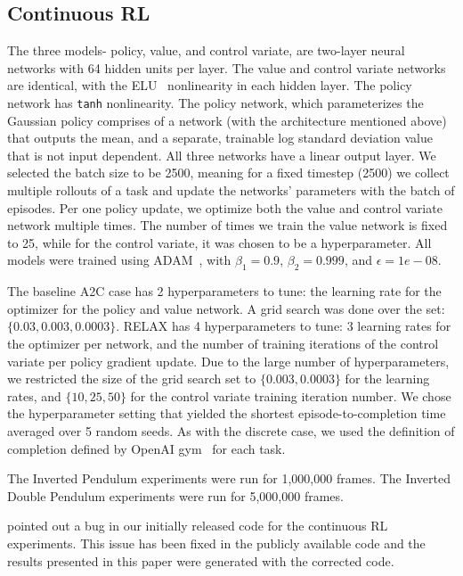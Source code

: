 \documentclass{article}
\newcommand{\RELAX}{{\textnormal{RELAX}}}
\begin{document}
\subsection{Continuous RL}
The three models- policy, value, and control variate, are two-layer neural networks with 64 hidden units per layer.
The value and control variate networks are identical, with the ELU~\citep{Clevert2016ELUs} nonlinearity in each hidden layer.
The policy network has \texttt{tanh} nonlinearity.
The policy network, which parameterizes the Gaussian policy comprises of a network (with the architecture mentioned above) that outputs the mean, and a separate, trainable log standard deviation value that is not input dependent.
All three networks have a linear output layer.
We selected the batch size to be 2500, meaning for a fixed timestep (2500) we collect multiple rollouts of a task and update the networks' parameters with the batch of episodes.
Per one policy update, we optimize both the value and control variate network multiple times.
The number of times we train  the value network is fixed to 25, while for the control variate, it was chosen to be a hyperparameter. 
All models were trained using ADAM~\citep{kingma2015adam}, with $\beta_1=0.9$, $\beta_2=0.999$, and $\epsilon=1e-08$. 

The baseline A2C case has 2 hyperparameters to tune: the learning rate for the optimizer for the policy and value network.
A grid search was done over the set: $\{0.03, 0.003, 0.0003\}$.
\RELAX{} has 4 hyperparameters to tune: 3 learning rates for the optimizer per network, and the number of training iterations of the control variate per policy gradient update.
Due to the large number of hyperparameters, we restricted the size of the grid search set to $\{0.003, 0.0003\}$ for the learning rates, and $\{10, 25, 50\}$ for the control variate training iteration number.
We chose the hyperparameter setting that yielded the shortest episode-to-completion time averaged over 5 random seeds.
As with the discrete case, we used the definition of completion defined by OpenAI gym~\citep{1606.01540} for each task. 

The Inverted Pendulum experiments were run for 1,000,000 frames.
The Inverted Double Pendulum experiments were run for 5,000,000 frames.

\citet{tucker2018mirage} pointed out a bug in our initially released code for the continuous RL experiments. This issue has been fixed in the publicly available code and the results presented in this paper were generated with the corrected code. 
\end{document}
